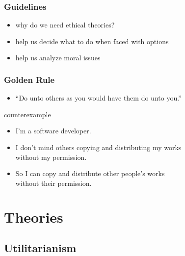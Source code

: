 \documentclass[dvipsnames]{beamer}
\theoremstyle{plain}
\begin{document}
\begin{frame}
  \frametitle{Guidelines}

  \begin{itemize}
    \item why do we need ethical theories?

    \medskip
    \item help us decide what to do when faced with options
    \item help us analyze moral issues
  \end{itemize}
\end{frame}

\begin{frame}
  \frametitle{Golden Rule}

  \begin{itemize}
    \item ``Do unto others as you would have them do unto you.''
  \end{itemize}

  \pause
  \medskip
  \begin{exampleblock}{counterexample}
    \begin{itemize}
      \item I'm a software developer.
      \item I don't mind others copying and distributing my works\\
        without my permission.
      \item So I can copy and distribute other people's works\\
        without their permission.
    \end{itemize}
  \end{exampleblock}
\end{frame}

\section{Theories}

\subsection{Utilitarianism}
\end{document}
